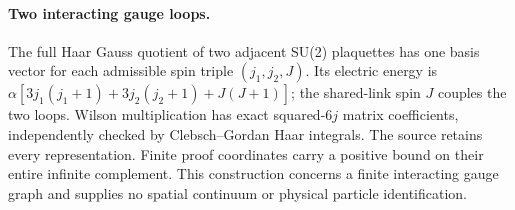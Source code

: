 \paragraph{Two interacting gauge loops.}
The full Haar Gauss quotient of two adjacent SU(2) plaquettes has one basis
vector for each admissible spin triple $(j_1,j_2,J)$. Its electric energy is
$\alpha[3j_1(j_1+1)+3j_2(j_2+1)+J(J+1)]$; the shared-link spin $J$ couples
the two loops. Wilson multiplication has exact squared-$6j$ matrix
coefficients, independently checked by Clebsch--Gordan Haar integrals.
The source retains every representation. Finite proof coordinates carry
a positive bound on their entire infinite complement. This construction
concerns a finite interacting gauge graph and supplies no spatial
continuum or physical particle identification.
